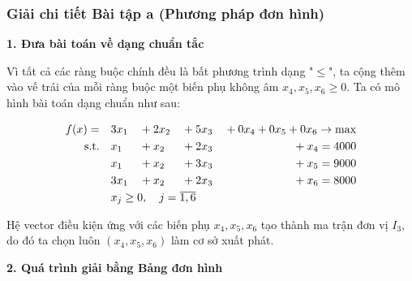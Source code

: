\subsubsection{Giải chi tiết Bài tập a (Phương pháp đơn hình)}

\textbf{1. Đưa bài toán về dạng chuẩn tắc}

Vì tất cả các ràng buộc chính đều là bất phương trình dạng "$\le$", ta cộng thêm vào vế trái của mỗi ràng buộc một biến phụ không âm $x_4, x_5, x_6 \ge 0$. 
Ta có mô hình bài toán dạng chuẩn như sau:

\begin{alignat*}{4}
    f(x) = \quad & 3x_1 & {}+{} & 2x_2 & {}+{} & 5x_3 & {}+{} 0x_4 + 0x_5 + 0x_6 \rightarrow \max \\
    \text{s.t.} \quad & x_1 & {}+{} & x_2 & {}+{} & 2x_3 & {}+{} x_4 = 4000 \\
    & x_1 & {}+{} & x_2 & {}+{} & 3x_3 & {}+{} x_5 = 9000 \\
    & 3x_1 & {}+{} & x_2 & {}+{} & 2x_3 & {}+{} x_6 = 8000 \\
    & \rlap{$x_j \ge 0, \quad j = \overline{1,6}$}
\end{alignat*}

Hệ vector điều kiện ứng với các biến phụ $x_4, x_5, x_6$ tạo thành ma trận đơn vị $I_3$, do đó ta chọn luôn $(x_4, x_5, x_6)$ làm cơ sở xuất phát.

\vspace{0.3cm}
\textbf{2. Quá trình giải bằng Bảng đơn hình}

